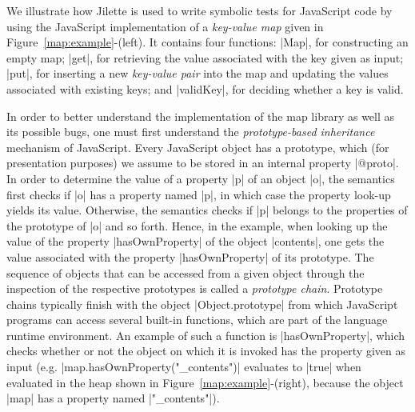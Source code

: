 We illustrate how Jilette is used to write symbolic tests for JavaScript code by using the JavaScript implementation 
of a  \emph{key-value map} given in Figure~\ref{map:example}-(left). 
It contains four functions: 
\jsinline|Map|, for constructing an empty map;
\jsinline|get|, for retrieving the value associated with the key given as input;
\jsinline|put|, for inserting a new \emph{key-value pair} into the map and updating the values associated with existing keys; and
\jsinline|validKey|, for deciding whether a key is valid.

In order to better understand the implementation of the map library as well as its possible bugs, 
one must first understand the \emph{prototype-based inheritance} mechanism of JavaScript. 
Every JavaScript object has a prototype, which (for presentation purposes) we assume to 
be stored  in an internal property \jsinline|@proto|. In order to determine the value of a property
\jsinline|p| of an object \jsinline|o|, the semantics first checks if \jsinline|o| has a 
property named \jsinline|p|, in which case the property look-up yields its value. Otherwise, the 
semantics checks if \jsinline|p| belongs to the properties of the prototype of \jsinline|o| and so 
forth. Hence, in the example, when looking up the value of the property \jsinline|hasOwnProperty|
of the object \jsinline|contents|, one gets the value associated with the property  \jsinline|hasOwnProperty|
of its prototype.
The sequence of objects that can be accessed from a given object through the inspection 
of the respective prototypes is called a \emph{prototype chain}.
Prototype chains typically finish with the object \jsinline|Object.prototype| from which JavaScript 
programs can access several built-in functions, which are part of the language runtime environment.
An example of such a function is \jsinline|hasOwnProperty|, which checks whether or not the object 
on which it is invoked has the property given as input (e.g. \jsinline|map.hasOwnProperty("_contents")| 
evaluates to \jsinline|true| when evaluated in the heap shown in Figure~\ref{map:example}-(right), 
because the object \jsinline|map| has a property named \jsinline|"_contents"|). 



